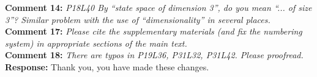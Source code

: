 \documentclass[11pt]{article}
\newcommand{\rev}[2]{\textbf{Comment #1: }\emph{#2}}
\newcommand{\resp}{\textbf{Response: }}
\begin{document}
\noindent \rev{14}{P18L40 By “state space of dimension 3”, do you mean “... of size 3”? Similar problem with the use of “dimensionality” in several places.} \\
\noindent \rev{17}{Please cite the supplementary materials (and fix the numbering system) in appropriate sections of the main text.} \\
\noindent \rev{18}{There are typos in P19L36, P31L32, P31L42. Please proofread.}\\
\resp{Thank you, you have made these changes.}
\end{document}
